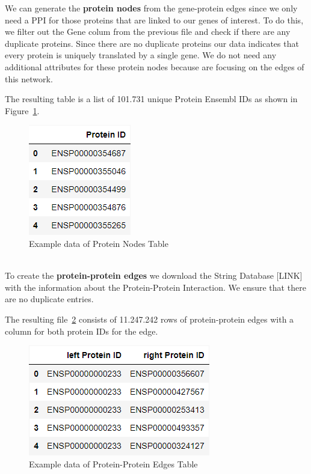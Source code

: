 We can generate the \textbf{protein nodes} from the gene-protein edges
since we only need a PPI for those proteins that are linked to our genes of interest.
To do this, we filter out the Gene colum from the previous file and check if there are any duplicate proteins.
Since there are no duplicate proteins our data indicates that every protein is uniquely translated by a single gene.
We do not need any additional attributes for these protein nodes because are focusing on the edges of this network.

The resulting table is a list of 101.731 unique Protein Ensembl IDs as shown in Figure~\ref{fig:03_02_df_protein_nodes}.
\begin{figure}[h]
\centering
\includegraphics[height=\dfheight]{figures/03_02_protein_nodes}
\caption{Example data of Protein Nodes Table}
\label{fig:03_02_df_protein_nodes}
\end{figure}
\\

To create the \textbf{protein-protein edges} we download the String Database [LINK] with the information about the Protein-Protein Interaction.
We ensure that there are no duplicate entries.

The resulting file~\ref{fig:03_02_df_protein_edges} consists of 11.247.242 rows of protein-protein edges with a column for both protein IDs for the edge.
\begin{figure}[h]
\centering
\includegraphics[height=\dfheight]{figures/03_02_protein_edges}
\caption{Example data of Protein-Protein Edges Table}
\label{fig:03_02_df_protein_edges}
\end{figure}


